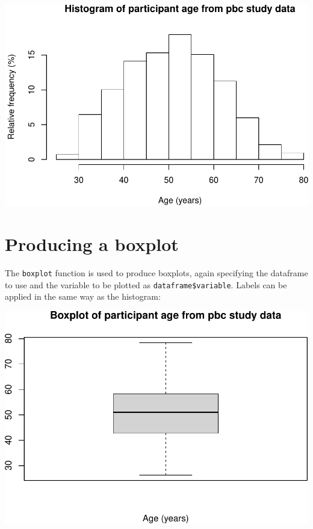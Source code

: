 \documentclass[
]{memoir}
\newenvironment{Shaded}{\begin{snugshade}}{\end{snugshade}}
\newcommand{\AttributeTok}[1]{\textcolor[rgb]{0.77,0.63,0.00}{#1}}
\newcommand{\FunctionTok}[1]{\textcolor[rgb]{0.00,0.00,0.00}{#1}}
\newcommand{\NormalTok}[1]{#1}
\newcommand{\SpecialCharTok}[1]{\textcolor[rgb]{0.00,0.00,0.00}{#1}}
\newcommand{\StringTok}[1]{\textcolor[rgb]{0.31,0.60,0.02}{#1}}
\begin{document}
\includegraphics{phcm9795-R-notes_files/figure-latex/unnamed-chunk-34-1.pdf}

\hypertarget{producing-a-boxplot}{%
\section{Producing a boxplot}\label{producing-a-boxplot}}

The \texttt{boxplot} function is used to produce boxplots, again specifying the dataframe to use and the variable to be plotted as \texttt{dataframe\$variable}. Labels can be applied in the same way as the histogram:

\begin{Shaded}
\end{Shaded}

\includegraphics{phcm9795-R-notes_files/figure-latex/unnamed-chunk-35-1.pdf}
\end{document}
